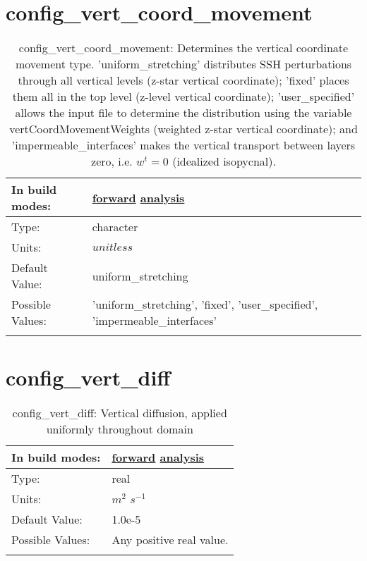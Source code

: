 \section[config\_vert\_coord\_movement]{config\_vert\_coord\_movement}
\label{sec:nm_sec_config_vert_coord_movement}
\begin{center}
\begin{longtable}{| p{2.0in} || p{4.0in} |}
    \hline
    In build modes: & \hyperref[subsec:forward_nm_tab_ALE_vertical_grid]{forward} \hyperref[subsec:analysis_nm_tab_ALE_vertical_grid]{analysis} \\
    \hline
    Type: & character \\
    \hline
    Units: & $unitless$ \\
    \hline
    Default Value: & uniform\_stretching \\
    \hline
    Possible Values: & 'uniform\_stretching', 'fixed', 'user\_specified', 'impermeable\_interfaces' \\
    \hline
    \caption{config\_vert\_coord\_movement:  Determines the vertical coordinate movement type. 'uniform\_stretching' distributes SSH perturbations through all vertical levels (z-star vertical coordinate); 'fixed' places them all in the top level (z-level vertical coordinate); 'user\_specified' allows the input file to determine the distribution using the variable vertCoordMovementWeights (weighted z-star vertical coordinate); and 'impermeable\_interfaces' makes the vertical transport between layers zero, i.e.  $w^t=0$  (idealized isopycnal).}
\end{longtable}
\end{center}
\section[config\_vert\_diff]{config\_vert\_diff}
\label{sec:nm_sec_config_vert_diff}
\begin{center}
\begin{longtable}{| p{2.0in} || p{4.0in} |}
    \hline
    In build modes: & \hyperref[subsec:forward_nm_tab_vmix_const]{forward} \hyperref[subsec:analysis_nm_tab_vmix_const]{analysis} \\
    \hline
    Type: & real \\
    \hline
    Units: & $m^2$ $s^{-1}$ \\
    \hline
    Default Value: & 1.0e-5 \\
    \hline
    Possible Values: & Any positive real value. \\
    \hline
    \caption{config\_vert\_diff: Vertical diffusion, applied uniformly throughout domain}
\end{longtable}
\end{center}
